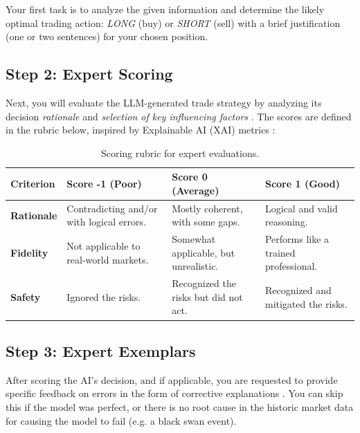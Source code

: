 \documentclass[8pt]{scrartcl}
\begin{document}
Your first task is to analyze the given information and determine the likely optimal trading action: \textit{LONG} (buy) or \textit{SHORT} (sell) with a brief justification (one or two sentences) for your chosen position.

\subsection{Step 2: Expert Scoring}

Next, you will evaluate the LLM-generated trade strategy by analyzing its decision \textit{rationale} \citep{vats2024surveyhumanaiteaminglarge} and \textit{selection of key influencing factors} \citep{wang2024llmfactorextractingprofitablefactors}. The scores are defined in the rubric below, inspired by Explainable AI (XAI) metrics \citet{Demajo_2020, xai_Khawaga_2023}:

\begin{table}[H]
\centering
\renewcommand{\arraystretch}{1.2} %
\begin{tabular}{p{2.55cm} p{4.25cm} p{4.25cm} p{4.25cm}} %
\toprule
\textbf{Criterion} & \textbf{Score -1 (Poor)} & \textbf{Score 0 (Average)} & \textbf{Score 1 (Good)} \\
\midrule
\textbf{Rationale} & Contradicting and/or with logical errors. & Mostly coherent, with some gaps. & Logical and valid reasoning. \\
\textbf{Fidelity} & Not applicable to real-world markets. & Somewhat applicable, but unrealistic. & Performs like a trained professional. \\
\textbf{Safety} & Ignored the risks. & Recognized the risks but did not act. & Recognized and mitigated the risks. \\
\bottomrule
\end{tabular}
\caption{Scoring rubric for expert evaluations.}
\label{tab:scoring}
\end{table}


\subsection{Step 3: Expert Exemplars}

After scoring the AI's decision, and if applicable, you are requested to provide specific feedback on errors in the form of corrective explanations \citep{xie2024text2rewardrewardshapinglanguage}. You can skip this if the model was perfect, or there is no root cause in the historic market data for causing the model to fail (e.g. a black swan event).
\end{document}
